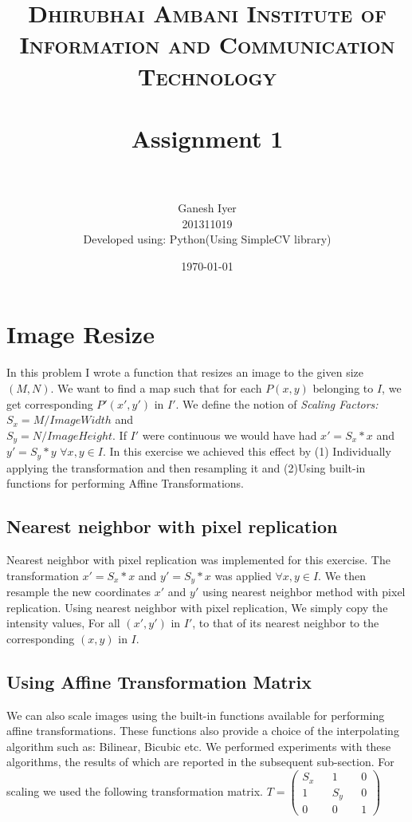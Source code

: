 \documentclass[paper=a4, fontsize=11pt]{scrartcl} %
\title{	
\normalfont \normalsize 
\textsc{Dhirubhai Ambani Institute of Information and Communication Technology} \\ [25pt] %
\horrule{0.5pt} \\[0.4cm] %
\huge Assignment 1 \\ %
\horrule{2pt} \\[0.5cm] %
}
\author{Ganesh Iyer \\ 201311019 \\Developed using: Python(Using SimpleCV library)}
\date{\normalsize\today} %
\numberwithin{equation}{section} %
\numberwithin{figure}{section} %
\numberwithin{table}{section} %
\begin{document}
\maketitle %


\section{Image Resize}

In this problem I wrote a function that resizes an image to the given size \((M,N)\). We want to find a map such that for each \(P(x,y)\) belonging to \(I\), we get corresponding \(P'(x',y')\) in \(I'\). We define the notion of \textsl{Scaling Factors:}\\ \(S_x = M/ImageWidth\) and \\\(S_y = N/ImageHeight\). If \(I'\) were continuous we would have had \(x' = S_x*x\) and \(y' = S_y*y\) \(\forall x,y \in I\). In this exercise we achieved this effect by (1) Individually applying the transformation and then resampling it and (2)Using built-in functions for performing Affine Transformations.

    \subsection{Nearest neighbor with pixel replication}
    \label{sec:pixelrep}
    Nearest neighbor with pixel replication was implemented for this exercise. The transformation \(x' = S_x*x\) and \(y' = S_y*x\) was applied \(\forall x,y \in I\). We then resample the new coordinates \(x'\) and \(y'\) using  nearest neighbor method with pixel replication. 
    Using nearest neighbor with pixel replication, We simply copy the intensity values, For all \((x', y')\) in \(I'\), to that of its nearest neighbor to the corresponding \((x,y)\) in \(I\). 
    
    \subsection{Using Affine Transformation Matrix}

    We can also scale images using the built-in functions available for performing affine transformations. These functions also provide a choice of the interpolating algorithm such as: Bilinear, Bicubic etc. We performed experiments with these algorithms, the results of which are reported in the subsequent sub-section. For scaling we used the following transformation matrix.
    \(
      T = 
      \begin{pmatrix}
        S_x && 1 && 0 \\
        1 && S_y && 0 \\
        0 && 0 && 1
      \end{pmatrix}
    \) 
\end{document}
